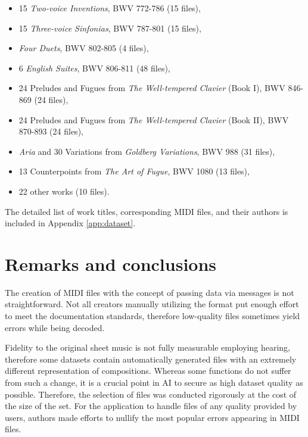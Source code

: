 \documentclass[a4paper, 11pt, twoside]{report}
\theoremstyle{definition}
\begin{document}
\begin{itemize}
    \item 15 \textit{Two-voice Inventions}, \small BWV 772-786 (15 files), \normalsize
    \item 15 \textit{Three-voice Sinfonias}, \small BWV 787-801 (15 files), \normalsize
    \item \textit{Four Duets}, \small BWV 802-805 (4 files), \normalsize
    \item 6 \textit{English Suites}, \small BWV 806-811 (48 files), \normalsize
    \item 24 Preludes and Fugues from \textit{The Well-tempered Clavier} (Book I), \small BWV 846-869 (24 files), \normalsize
    \item 24 Preludes and Fugues from \textit{The Well-tempered Clavier} (Book II), \small BWV 870-893 (24 files), \normalsize
    \item \textit{Aria} and 30 Variations from \textit{Goldberg Variations}, \small BWV 988 (31 files), \normalsize
    \item 13 Counterpoints from \textit{The Art of Fugue}, \small BWV 1080 (13 files), \normalsize
    \item 22 other works \small (10 files). \normalsize
\end{itemize} \par

The detailed list of work titles, corresponding MIDI files, and their authors is included in Appendix \ref{app:dataset}. \par


\section{Remarks and conclusions}

The creation of MIDI files with the concept of passing data via messages is not straightforward. Not all creators manually utilizing the format put enough effort to meet the documentation standards, therefore low-quality files sometimes yield errors while being decoded.  \par
Fidelity to the original sheet music is not fully measurable employing hearing, therefore some datasets contain automatically generated files with an extremely different representation of compositions. Whereas some functions do not suffer from such a change, it is a crucial point in AI to secure as high dataset quality as possible. Therefore, the selection of files was conducted rigorously at the cost of the size of the set. For the application to handle files of any quality provided by users, authors made efforts to nullify the most popular errors appearing in MIDI files. \par
\end{document}
